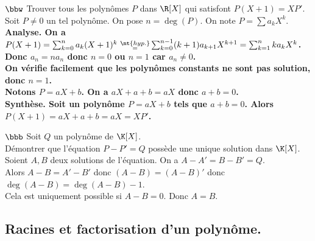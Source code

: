 \documentclass[11pt]{article}
\begin{document}
\vspace*{-0.5cm}

\begin{exercice}{$\bbw$}{}
    Trouver tous les polynômes $P$ dans $\R[X]$ qui satisfont $P(X+1)=XP'$.
    \tcblower
    Soit $P\neq0$ un tel polynôme. On pose $n=\deg(P)$. On note $P=\sum a_kX^k$.\\
    \bf{Analyse.} On a $P(X+1)=\sum_{k=0}^n a_k(X+1)^k~\substack{\nt{hyp.}\\=}\sum_{k=0}^{n-1}(k+1)a_{k+1}X^{k+1}=\sum_{k=1}^nka_kX^k$.\\
    Donc $a_n=na_n$ donc $n=0$ ou $n=1$ car $a_n\neq0$.\\
    On vérifie facilement que les polynômes constants ne sont pas solution, donc $n=1$.\\
    Notons $P=aX+b$. On a $aX+a+b=aX$ donc $a+b=0$.\\
    \bf{Synthèse.} Soit un polynôme $P=aX+b$ tels que $a+b=0$. Alors $P(X+1)=aX+a+b=aX=XP'$.
\end{exercice}

\begin{exercice}{$\bbb$}{}
    Soit $Q$ un polynôme de $\K[X]$.\\
    Démontrer que l'équation $P-P'=Q$ possède une unique solution dans $\K[X]$.
    \tcblower
    Soient $A,B$ deux solutions de l'équation. On a $A-A'=B-B'=Q$.\\
    Alors $A-B=A'-B'$ donc $(A-B)=(A-B)'$ donc $\deg(A-B)=\deg(A-B)-1$.\\
    Cela est uniquement possible si $A-B=0$. Donc $A=B$.
\end{exercice}

\subsection*{Racines et factorisation d'un polynôme.}
\end{document}
